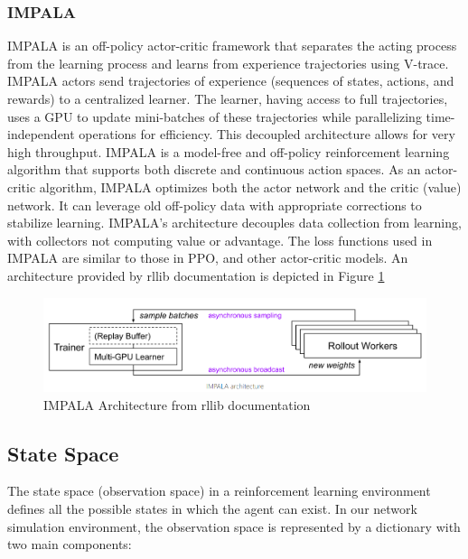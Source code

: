 \documentclass[conference]{IEEEtran}
\begin{document}
\subsubsection{IMPALA}
IMPALA\cite{DBLP:journals/corr/abs-1802-01561} is an off-policy actor-critic framework that separates the acting process from the learning process and learns from experience trajectories using V-trace. IMPALA actors send trajectories of experience (sequences of states, actions, and rewards) to a centralized learner. The learner, having access to full trajectories, uses a GPU to update mini-batches of these trajectories while parallelizing time-independent operations for efficiency. This decoupled architecture allows for very high throughput. IMPALA is a model-free and off-policy reinforcement learning algorithm that supports both discrete and continuous action spaces. As an actor-critic algorithm, IMPALA optimizes both the actor network and the critic (value) network. It can leverage old off-policy data with appropriate corrections to stabilize learning. IMPALA's architecture decouples data collection from learning, with collectors not computing value or advantage. The loss functions used in IMPALA are similar to those in PPO, and other actor-critic models. An architecture provided by rllib documentation is depicted in Figure \ref{fig:your_label_impala}
\begin{figure}[h!]
    \centering
    \includegraphics[width=\columnwidth]{images/impala.png}
    \caption{IMPALA Architecture from rllib documentation}
    \label{fig:your_label_impala}
\end{figure}

\subsection{State Space}

The state space (observation space) in a reinforcement learning environment defines all the possible states in which the agent can exist. In our network simulation environment, the observation space is represented by a dictionary with two main components:
\end{document}
